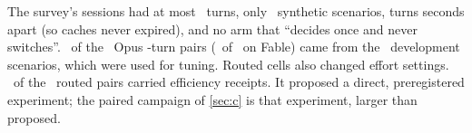 \begin{caution}[title={Why a new experiment was needed}]
The survey's sessions had at most \CaTurns\ turns, only \CaScenarios\ synthetic scenarios, turns seconds apart
(so caches never expired), and no arm that ``decides once and never switches''. \CaOpusFourDevPairs\ of the \CaOpusFourPairs\ Opus \CaTurns-turn pairs (\CaFableFourDevPairs\ of
\CaFableFourPairs\ on Fable) came from the \CaDevScenarios\ development scenarios, which were used for tuning.
Routed cells also changed effort settings. \CaReceipts\ of the
\CaRoutedPairs\ routed pairs carried efficiency receipts. It proposed a direct, preregistered experiment; the paired
campaign of \cref{sec:c} is that experiment, larger than proposed.
\end{caution}
